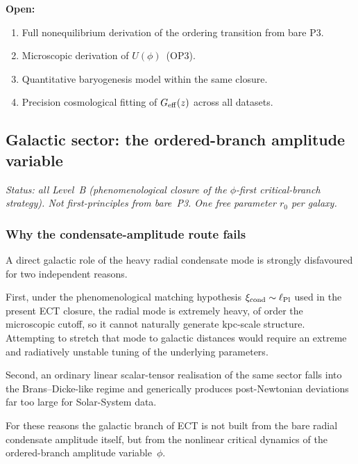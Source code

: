 \documentclass[11pt,a4paper]{article}
\numberwithin{equation}{section}
\begin{document}
\textbf{Open:}
\begin{enumerate}[label=(\roman*)]
  \item Full nonequilibrium derivation of the ordering transition from
    bare P3.
  \item Microscopic derivation of $U(\phi)$~(OP3).
  \item Quantitative baryogenesis model within the same closure.
  \item Precision cosmological fitting of $G_{\rm eff}(z)$ across
    all datasets.
\end{enumerate}


\subsection{Galactic sector: the ordered-branch amplitude variable}
\label{sec:mp_galactic}

\textit{Status: all Level~B (phenomenological closure of the
$\phi$-first critical-branch strategy). Not first-principles from
bare~P3. One free parameter $r_0$ per galaxy.}

\subsubsection*{Why the condensate-amplitude route fails}

A direct galactic role of the heavy radial condensate mode is strongly
disfavoured for two independent reasons.

First, under the phenomenological matching hypothesis
$\xi_{\rm cond}\sim\ell_{\rm Pl}$ used in the present ECT closure,
the radial mode is extremely heavy, of order the microscopic cutoff,
so it cannot naturally generate kpc-scale structure.
Attempting to stretch that mode to galactic distances would require an
extreme and radiatively unstable tuning of the underlying parameters.

Second, an ordinary linear scalar-tensor realisation of the same
sector falls into the Brans--Dicke-like regime and generically produces
post-Newtonian deviations far too large for Solar-System data.

For these reasons the galactic branch of ECT is not built from the bare
radial condensate amplitude itself, but from the nonlinear critical
dynamics of the ordered-branch amplitude variable~$\phi$.
\end{document}

